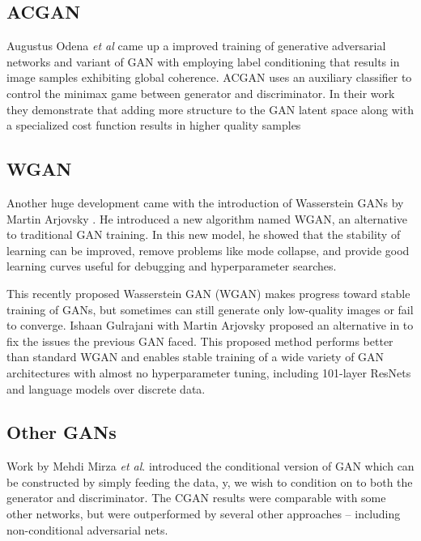 \documentclass{vldb}
\begin{document}

\subsection{ACGAN} %
\label{sec:acgan}
Augustus Odena \textit{et al} \cite{acgan} came up a improved training of generative adversarial networks and variant of GAN with employing label conditioning that results in image samples exhibiting global coherence. ACGAN uses an auxiliary classifier to control the minimax game between generator and discriminator. In their work they demonstrate that adding more structure to the GAN latent space along with a specialized cost function results in higher quality samples

\subsection{WGAN} %
\label{sec:wgan}
Another huge development came with the introduction of Wasserstein GANs by Martin Arjovsky \cite{wgan} . He introduced a new algorithm named WGAN, an alternative to traditional GAN training. In this new model, he showed that the stability of learning can be improved, remove problems like mode collapse, and provide good learning curves useful for debugging and hyperparameter searches.
\par\bigskip

This recently proposed Wasserstein GAN (WGAN) \cite{wgan} makes progress toward stable training of GANs, but sometimes can still generate only low-quality images or fail to converge. 
Ishaan Gulrajani with Martin Arjovsky proposed an alternative in \cite{improvedwgan} to fix the issues the previous GAN faced. This proposed method performs better than standard WGAN and enables stable training of a wide variety of GAN architectures with almost no hyperparameter tuning, including 101-layer ResNets \cite{deepresidual} and language models over discrete data.
\par\bigskip

\subsection{Other GANs} %
\label{sec:other_gan}
Work by Mehdi Mirza \textit{et al}. \cite{congan} introduced the conditional version of GAN which can be constructed by simply feeding the data, y, we wish to condition on to both the generator and discriminator. The CGAN results were comparable with some other networks, but were outperformed by several other approaches – including non-conditional adversarial nets.
\par\bigskip
\end{document}
